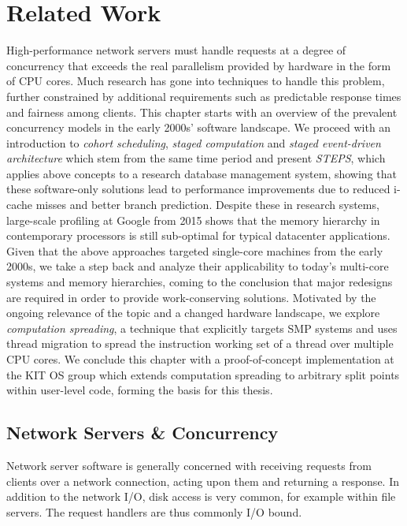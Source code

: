 \documentclass[12pt,a4paper]{book}
\begin{document}
\chapter{Related Work}\label{ch:relwork}
High-performance network servers must handle requests at a degree of concurrency that exceeds the real parallelism provided by hardware in the form of CPU cores.
Much research has gone into techniques to handle this problem, further constrained by additional requirements such as predictable response times and fairness among clients.
This chapter starts with an overview of the prevalent concurrency models in the early 2000s' software landscape.
We proceed with an introduction to \emph{cohort scheduling}, \emph{staged computation} and \emph{staged event-driven architecture} which stem from the same time period
and present \emph{STEPS}, which applies above concepts to a research database management system, showing that these software-only solutions lead to performance improvements due to reduced i-cache misses and better branch prediction.
Despite these in research systems, large-scale profiling at Google from 2015 shows that the memory hierarchy in contemporary processors is still sub-optimal for typical datacenter applications.
Given that the above approaches targeted single-core machines from the early 2000s, we take a step back and analyze their applicability to today's multi-core systems and memory hierarchies,
coming to the conclusion that major redesigns are required in order to provide work-conserving solutions.
Motivated by the ongoing relevance of the topic and a changed hardware landscape, we explore \emph{computation spreading}, a technique that explicitly targets SMP systems and uses thread migration to spread the instruction working set of a thread over multiple CPU cores.
We conclude this chapter with a proof-of-concept implementation at the KIT OS group which extends computation spreading to arbitrary split points within user-level code, forming the basis for this thesis.

\section{Network Servers \& Concurrency}\label{ch:relwork:concmod}
Network server software is generally concerned with receiving requests from clients over a network connection, acting upon them and returning a response.
In addition to the network I/O, disk access is very common, for example within file servers.
The request handlers are thus commonly I/O bound.~\cite{seda}
\end{document}
